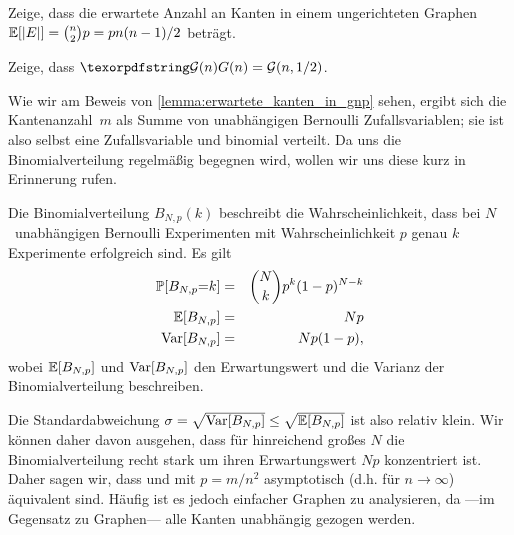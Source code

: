 \begin{exercise}
    Zeige, dass die erwartete Anzahl an Kanten in einem ungerichteten \Gnp Graphen $\mathbb{E}\!\left[|E|\right] = \binom{n}{2} p = p n(n-1)/2$ beträgt.
\end{exercise}

\begin{exercise}
    Zeige, dass $\Gn = \mathcal G(n, 1/2)$.
\end{exercise}

\bigskip

Wie wir am Beweis von \cref{lemma:erwartete_kanten_in_gnp} sehen, ergibt sich die Kantenanzahl~$m$ als Summe von unabhängigen Bernoulli Zufallsvariablen;
sie ist also selbst eine Zufallsvariable und binomial verteilt.
Da uns die Binomialverteilung regelmäßig begegnen wird, wollen wir uns diese kurz in Erinnerung rufen.
\begin{definition}
    Die  Binomialverteilung $B_{N, p}(k)$ beschreibt die Wahrscheinlichkeit, dass bei $N$~unabhängigen Bernoulli Experimenten mit Wahrscheinlichkeit $p$ genau $k$ Experimente erfolgreich sind.
    Es gilt 
    \begin{eqnarray*}
        \mathbb{P}\!\left[B_{N,p} {=} k\right] &=& \binom{N}{k} p^k (1-p)^{N-k} \\
        \mathbb{E}\!\left[B_{N,p}\right] &=& Np \\
        \operatorname{Var}\!\left[B_{N,p}\right] &=& Np(1-p),
    \end{eqnarray*}
    wobei $\mathbb{E}\!\left[B_{N,p}\right]$ und $\operatorname{Var}\!\left[B_{N,p}\right]$ den Erwartungswert und die Varianz der Binomialverteilung beschreiben.
\end{definition}

Die Standardabweichung $\sigma = \sqrt{\operatorname{Var}\!\left[B_{N,p}\right]} \le \sqrt{\mathbb{E}\!\left[B_{N,p}\right]}$ ist also relativ klein.
Wir können daher davon ausgehen, dass für hinreichend großes $N$ die Binomialverteilung recht stark um ihren Erwartungswert $Np$ konzentriert ist.
Daher sagen wir, dass \Gnm und \Gnp mit $p=m/n^2$ asymptotisch (d.h. für $n \to \infty$) äquivalent sind.
Häufig ist es jedoch einfacher \Gnp Graphen zu analysieren, da ---im Gegensatz zu \Gnm Graphen--- alle Kanten unabhängig gezogen werden.


